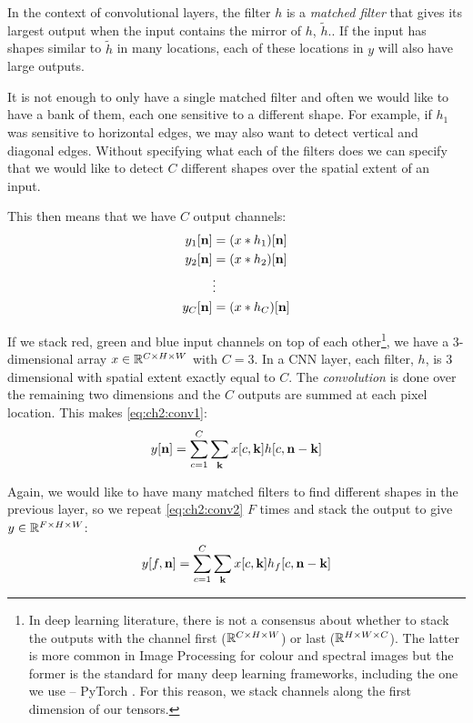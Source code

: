 In the context of convolutional layers, the filter $h$ is a \emph{matched filter} 
that gives its largest output when the input contains the mirror of $h$, $\tilde{h}$.. If the input has
shapes similar to $\tilde{h}$ in many locations, each of these locations in $y$ will
also have large outputs. 

It is not enough to only have a single matched filter and often we would like to
have a bank of them, each one sensitive to a different shape. For example, if $h_1$
was sensitive to horizontal edges, we may also want to detect vertical and
diagonal edges. Without specifying what each of the filters does we can 
specify that we would like to detect $C$ different shapes over the spatial
extent of an input.

This then means that we have $C$ output channels:
\begin{align}
  y_1[\nn] &= (x \conv h_1)[\nn] \\
  y_2[\nn] &= (x \conv h_2)[\nn] \\
           &\vdots  \nonumber \\
  y_C[\nn] &= (x \conv h_C)[\nn] 
\end{align}

If we stack red, green and blue input channels on top of each other\footnote{In deep 
learning literature, there is not a consensus about whether to stack the outputs
with the channel first ($\reals[C\x H\x W]$) or last ($\reals[H\x W\x C]$). The
latter is more common in Image Processing for colour and spectral images but
the former is the standard for many deep learning frameworks, including the one
we use -- PyTorch \cite{paszke_automatic_2017}. For this reason, we stack
channels along the first dimension of our tensors.}, we have a 
3-dimensional array $x \in \reals[C\x H\x W]$ with $C=3$.
In a CNN layer, each filter, $h$, is 3 dimensional with spatial extent exactly
equal to $C$. The \emph{convolution} is done over the remaining two dimensions
and the $C$ outputs are summed at each pixel location. This makes
\eqref{eq:ch2:conv1}:
\begin{equation}
  y[\nn] = \sum_{c=1}^C \sum_{\mathbf{k}} x[c, \mathbf{k}]h[c, \nn-\mathbf{k}]
  \label{eq:ch2:conv2}
\end{equation}

Again, we would like to have many matched filters to find different shapes in
the previous layer, so we repeat \eqref{eq:ch2:conv2} $F$ times and stack the
output to give $y \in \reals[F \x H\x W]$: 
%
\begin{equation}
  y[f, \nn] = \sum_{c=1}^C \sum_{\mathbf{k}} x[c, \mathbf{k}]h_f[c, \nn-\mathbf{k}]
  \label{eq:ch2:conv3}
\end{equation}

